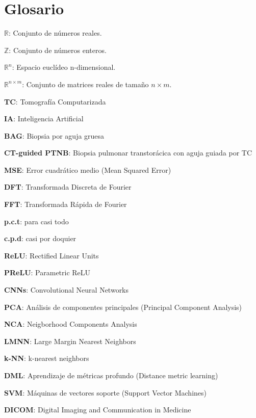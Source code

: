 
\chapter*{Glosario}


\begin{description}
  \item $\mathbb{R}$: Conjunto de números reales.
  \item $\mathbb{Z}$: Conjunto de números enteros.
  \item $\mathbb{R}^n$: Espacio euclídeo n-dimensional.
  \item $\mathbb{R}^{n \times m}$: Conjunto de matrices reales de tamaño $n \times m$.
  \item \textbf{TC}: Tomografía Computarizada
  \item \textbf{IA}: Inteligencia Artificial
  \item \textbf{BAG}: Biopsia por aguja gruesa
  \item \textbf{CT-guided PTNB}: Biopsia pulmonar transtorácica con aguja guiada por TC
  \item \textbf{MSE}: Error cuadrático medio (Mean Squared Error)
  \item \textbf{DFT}: Transformada Discreta de Fourier
  \item \textbf{FFT}: Transformada Rápida de Fourier
  \item \textbf{p.c.t}: para casi todo
  \item \textbf{c.p.d}: casi por doquier
  \item \textbf{ReLU}: Rectified Linear Units
  \item \textbf{PReLU}: Parametric ReLU
  \item \textbf{CNNs}: Convolutional Neural Networks
  \item \textbf{PCA}: Análisis de componentes principales (Principal Component Analysis)
  \item \textbf{NCA}: Neigborhood Components Analysis
  \item \textbf{LMNN}: Large Margin Nearest Neighbors
  \item \textbf{k-NN}: k-nearest neighbors
  \item \textbf{DML}: Aprendizaje de métricas profundo (Distance metric learning)
  \item \textbf{SVM}: Máquinas de vectores soporte (Support Vector Machines)
  \item \textbf{DICOM}: Digital Imaging and Communication in Medicine

\end{description}
